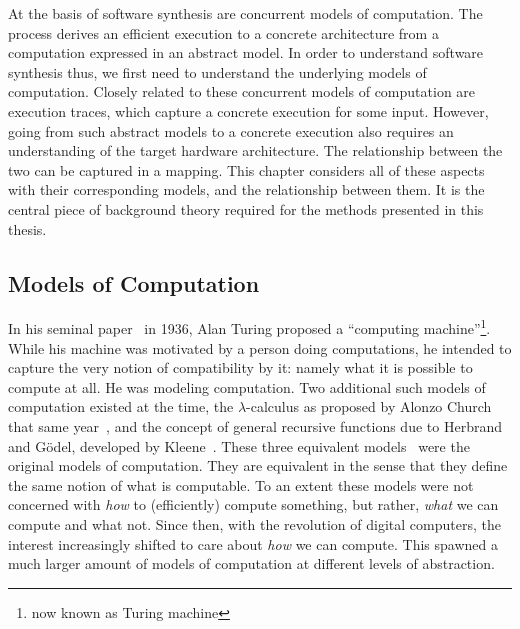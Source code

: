 At the basis of software synthesis are concurrent models of computation. The process derives an efficient execution to a concrete architecture from a computation expressed in an abstract model.
In order to understand software synthesis thus, we first need to understand the underlying models of computation.
Closely related to these concurrent models of computation are execution traces, which capture a concrete execution for some input.
However, going from such abstract models to a concrete execution also requires an understanding of the target hardware architecture.
The relationship between the two can be captured in a mapping.
This chapter considers all of these aspects with their corresponding models, and the relationship between them.
It is the central piece of background theory required for the methods presented in this thesis.

\subsection{Models of Computation}
\label{sec:mocs}

In his seminal paper~\cite{turing1936computable} in 1936, Alan Turing proposed a ``computing machine''\footnote{now known as Turing machine}.   
While his machine was motivated by a person doing computations, he intended to capture the very notion of compatibility by it: namely what it is possible to compute at all.
He was modeling computation.
Two additional such models of computation existed at the time, the $\lambda$-calculus as proposed by Alonzo Church that same year~\cite{church1936unsolvable}, and the concept of general recursive functions due to Herbrand and Gödel, developed by Kleene~\cite{kleene1936recursive}.
These three equivalent models~\cite{turing1937comuptability} were the original models of computation.
They are equivalent in the sense that they define the same notion of what is computable.
To an extent these models were not concerned with \emph{how} to (efficiently) compute something, but rather, \emph{what} we can compute and what not.
Since then, with the revolution of digital computers, the interest increasingly shifted to care about \emph{how} we can compute.
This spawned a much larger amount of models of computation at different levels of abstraction.

